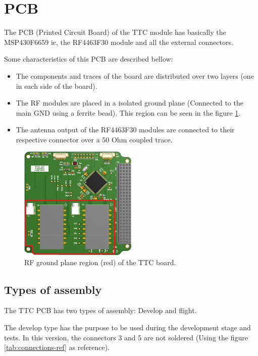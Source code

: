\section{PCB}

The PCB (Printed Circuit Board) of the TTC module has basically the MSP430F6659 ic, the RF4463F30 module and all the external connectors.

Some characteristics of this PCB are described bellow:

\begin{itemize}
	\item The components and traces of the board are distributed over two layers (one in each side of the board).
	\item The RF modules are placed in a isolated ground plane (Connected to the main GND using a ferrite bead). This region can be seen in the figure \ref{fig:rf-ground-plane}.
	\item The antenna output of the RF4463F30 modules are connected to their respective connector over a 50 Ohm coupled trace.
\end{itemize}

\begin{figure}[!h]
	\begin{center}
		\includegraphics[width=0.5\textwidth]{figures/ttc_rf_ground_plane.png}
		\caption{RF ground plane region (red) of the TTC board.}
		\label{fig:rf-ground-plane}
	\end{center}
\end{figure}

\subsection{Types of assembly}

The TTC PCB has two types of assembly: Develop and flight.

The develop type has the purpose to be used during the development stage and tests. In this version, the connectors 3 and 5 are not soldered (Using the figure \ref{tab:connections-ref} as reference).

